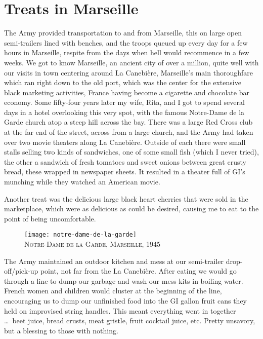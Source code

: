 \documentclass[../m3y]{subfiles}
\begin{document}
\section{Treats in Marseille}
The Army provided transportation to and from Marseille, this on large open semi-trailers lined with benches, and the troops queued up every day for a few hours in Marseille, respite from the days when hell would recommence in a few weeks. We got to know Marseille, an ancient city of over a million, quite well with our visits in town centering around La Canebi\`ere, Marseille's main thoroughfare which ran right down to the old port, which was the center for the extensive black marketing activities, France having become a cigarette and chocolate bar economy. Some fifty-four years later my wife, Rita, and I got to spend several days in a hotel overlooking this very spot, with the famous Notre-Dame de la Garde church atop a steep hill across the bay. There was a large Red Cross club at the far end of the street, across from a large church, and the Army had taken over two movie theaters along La Canebi\`ere. Outside of each there were small stalls selling two kinds of sandwiches, one of some small fish (which I never tried), the other a sandwich of fresh tomatoes and sweet onions between great crusty bread, these wrapped in newspaper sheets. It resulted in a theater full of GI's munching while they watched an American movie.

Another treat was the delicious large black heart cherries that were sold in the marketplace, which were as delicious as could be desired, causing me to eat to the point of being uncomfortable.

\begin{figure}[h]
\centering
\texttt{[image: notre-dame-de-la-garde]}\\
\medskip
{\newtimes\textsc{Notre-Dame de la Garde, Marseille, 1945}}
\end{figure}

The Army maintained an outdoor kitchen and mess at our semi-trailer drop-off/pick-up point, not far from the La Canebi\`ere. After eating we would go through a line to dump our garbage and wash our mess kits in boiling water. French women and children would cluster at the beginning of the line, encouraging us to dump our unfinished food into the GI gallon fruit cans they held on improvised string handles. This meant everything went in together \ldots\ beet juice, bread crusts, meat gristle, fruit cocktail juice, etc\@. Pretty unsavory, but a blessing to those with nothing.
\end{document}

